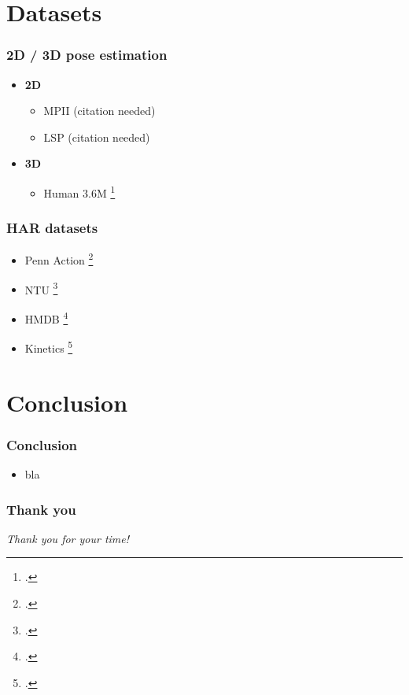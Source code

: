 \documentclass[9pt]{beamer}
\providecommand{\fcite}[1]{\footcite{#1}}
\newenvironment{myframe}[1][]{%
\begin{frame}%
\frametitle{#1}
\setcounter{footnote}{0}


}{%
\end{frame}%
}
\begin{document}
\section{Datasets}
\begin{myframe}[2D / 3D pose estimation]
  \begin{itemize}
      \item \textbf{2D}
      \begin{itemize}
          \item MPII (citation needed)
          \item LSP (citation needed)
      \end{itemize}
      \item \textbf{3D}
      \begin{itemize}
          \item Human 3.6M \fcite{ionescu_human3.6m:_2014}
      \end{itemize}
  \end{itemize}
\end{myframe}

\begin{myframe}[HAR datasets]
  \begin{itemize}
      \item Penn Action \fcite{zhang_actemes_2013}
      \item NTU \fcite{shahroudy_ntu_2016}
      \item HMDB \fcite{kuehne_hmdb:_2011}
      \item Kinetics \fcite{kay_kinetics_2017}
  \end{itemize}
\end{myframe}

\section{Conclusion}

\begin{myframe}[Conclusion]
    \begin{itemize}
        \item bla
    \end{itemize}
\end{myframe}

\begin{myframe}[Thank you]
    \centering \Large
    \emph{Thank you for your time!}
\end{myframe}

%
%
\end{document}
